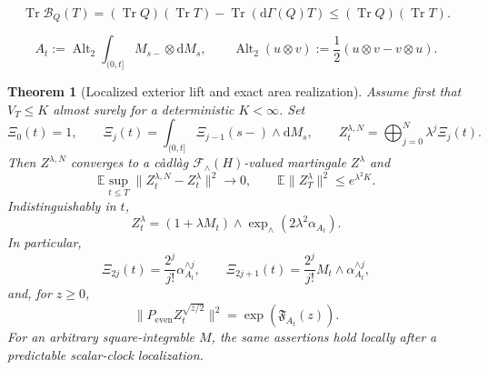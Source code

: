 \documentclass[10pt,a4paper]{amsart}
\newtheorem{theorem}{Theorem}
\begin{document}
\begin{equation}
 \operatorname{Tr}\mathcal B_Q(T)
 =(\operatorname{Tr}Q)(\operatorname{Tr}T)
  -\operatorname{Tr}(\mathrm d\Gamma(Q)T)
 \leq(\operatorname{Tr}Q)(\operatorname{Tr}T).
 \label{cc:eq-particle-hole-trace}
\end{equation}

\begin{equation}
 A_t:=\operatorname{Alt}_2
       \int_{(0,t]}M_{s-}\otimes\mathrm dM_s,
 \qquad
 \operatorname{Alt}_2(u\otimes v)
 :=\frac12(u\otimes v-v\otimes u).
 \label{cc:eq-chronological-area}
\end{equation}

\begin{theorem}[Localized exterior lift and exact area realization]
\label{cc:thm-localized-exterior-lift}
Assume first that \(V_T\leq K\) almost surely for a deterministic
\(K<\infty\).  Set
\begin{equation}
 \Xi_0(t)=1,
 \qquad
 \Xi_j(t)=\int_{(0,t]}\Xi_{j-1}(s-)\wedge\mathrm dM_s,
 \qquad
 Z_t^{\lambda,N}=\bigoplus_{j=0}^N\lambda^j\Xi_j(t).
 \label{cc:eq-exterior-iterates}
\end{equation}
Then \(Z^{\lambda,N}\) converges to a c\`adl\`ag
\(\mathcal F_{\wedge}(H)\)-valued martingale \(Z^\lambda\) and
\begin{equation}
 \mathbb E\sup_{t\leq T}
 \|Z_t^{\lambda,N}-Z_t^\lambda\|^2\longrightarrow0,
 \qquad
 \mathbb E\|Z_T^\lambda\|^2\leq e^{\lambda^2K}.
 \label{cc:eq-exterior-energy}
\end{equation}
Indistinguishably in \(t\),
\begin{equation}
 Z_t^\lambda=(1+\lambda M_t)\wedge
 \exp_{\wedge}(2\lambda^2\alpha_{A_t}).
 \label{cc:eq-exact-exterior-area}
\end{equation}
In particular,
\begin{equation}
 \Xi_{2j}(t)=\frac{2^j}{j!}\alpha_{A_t}^{\wedge j},
 \qquad
 \Xi_{2j+1}(t)=\frac{2^j}{j!}
 M_t\wedge\alpha_{A_t}^{\wedge j},
 \label{cc:eq-exterior-level-formulas}
\end{equation}
and, for \(z\geq0\),
\begin{equation}
 \|P_{\mathrm{even}}Z_t^{\sqrt{z/2}}\|^2
 =\exp(\mathfrak F_{A_t}(z)).
 \label{cc:eq-even-profile-identity}
\end{equation}
For an arbitrary square-integrable \(M\), the same assertions hold locally
after a predictable scalar-clock localization.
\end{theorem}
\end{document}
